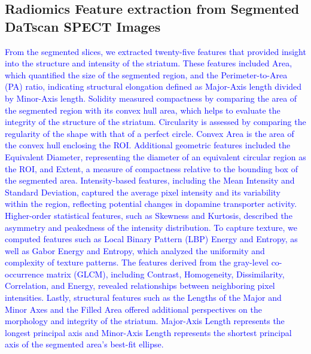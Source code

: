 \documentclass[twocolumn]{article}
\begin{document}
\subsection{Radiomics Feature extraction from Segmented DaTscan SPECT Images}

\textcolor{blue}{From the segmented slices, we extracted twenty-five features that provided insight into the structure and intensity of the striatum. These features included Area, which quantified the size of the segmented region, and the Perimeter-to-Area (PA) ratio, indicating structural elongation defined as Major-Axis length divided by Minor-Axis length. Solidity measured compactness by comparing the area of the segmented region with its convex hull area, which helps to evaluate the integrity of the structure of the striatum. Circularity is assessed by comparing the regularity of the shape with that of a perfect circle. Convex Area is the area of the convex hull enclosing the ROI. Additional geometric features included the Equivalent Diameter, representing the diameter of an equivalent circular region as the ROI, and Extent, a measure of compactness relative to the bounding box of the segmented area. Intensity-based features, including the Mean Intensity and Standard Deviation, captured the average pixel intensity and its variability within the region, reflecting potential changes in dopamine transporter activity. Higher-order statistical features, such as Skewness and Kurtosis, described the asymmetry and peakedness of the intensity distribution. To capture texture, we computed features such as Local Binary Pattern (LBP) Energy and Entropy, as well as Gabor Energy and Entropy, which analyzed the uniformity and complexity of texture patterns. The features derived from the gray-level co-occurrence matrix (GLCM), including Contrast, Homogeneity, Dissimilarity, Correlation, and Energy, revealed relationships between neighboring pixel intensities. Lastly, structural features such as the Lengths of the Major and Minor Axes and the Filled Area offered additional perspectives on the morphology and integrity of the striatum. Major-Axis Length represents the longest principal axis and Minor-Axis Length represents the shortest principal axis of the segmented area's best-fit ellipse.}
\end{document}
